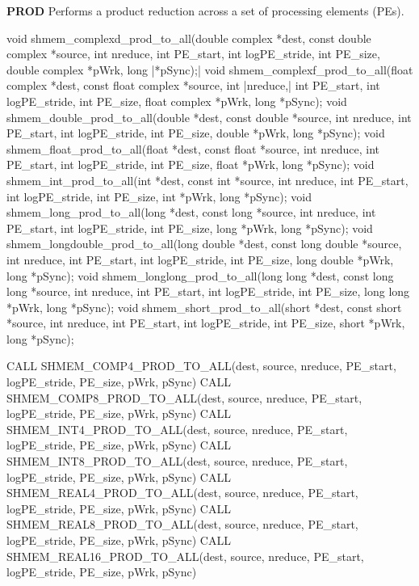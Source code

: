 \begin{apidefinition}
\bigskip
\textbf{PROD} \newline
Performs a product reduction across a set of processing elements (\ac{PE}s).\newline
\begin{Csynopsis}
void shmem_complexd_prod_to_all(double complex *dest, const double complex *source, int nreduce, int PE_start, int logPE_stride, int PE_size, double complex *pWrk, long |\mbox{*pSync);}|
void shmem_complexf_prod_to_all(float complex *dest, const float complex *source, int |\mbox{nreduce,}| int PE_start, int logPE_stride, int PE_size, float complex *pWrk, long *pSync);
void shmem_double_prod_to_all(double *dest, const double *source, int nreduce, int PE_start, int logPE_stride, int PE_size, double *pWrk, long *pSync);
void shmem_float_prod_to_all(float *dest, const float *source, int nreduce, int PE_start, int logPE_stride, int PE_size, float *pWrk, long *pSync);
void shmem_int_prod_to_all(int *dest, const int *source, int nreduce, int PE_start, int logPE_stride, int PE_size, int *pWrk, long *pSync);
void shmem_long_prod_to_all(long *dest, const long *source, int nreduce, int PE_start, int logPE_stride, int PE_size, long *pWrk, long *pSync);
void shmem_longdouble_prod_to_all(long double *dest, const long double *source, int nreduce, int PE_start, int logPE_stride, int PE_size, long double *pWrk, long *pSync);
void shmem_longlong_prod_to_all(long long *dest, const long long *source, int nreduce, int PE_start, int logPE_stride, int PE_size, long long *pWrk, long *pSync);
void shmem_short_prod_to_all(short *dest, const short *source, int nreduce, int PE_start, int logPE_stride, int PE_size, short *pWrk, long *pSync);
\end{Csynopsis}

\begin{Fsynopsis}
CALL SHMEM_COMP4_PROD_TO_ALL(dest, source, nreduce, PE_start, logPE_stride, PE_size, pWrk, pSync)
CALL SHMEM_COMP8_PROD_TO_ALL(dest, source, nreduce, PE_start, logPE_stride, PE_size, pWrk, pSync)
CALL SHMEM_INT4_PROD_TO_ALL(dest, source, nreduce, PE_start, logPE_stride, PE_size, pWrk, pSync)
CALL SHMEM_INT8_PROD_TO_ALL(dest, source, nreduce, PE_start, logPE_stride, PE_size, pWrk, pSync)
CALL SHMEM_REAL4_PROD_TO_ALL(dest, source, nreduce, PE_start, logPE_stride, PE_size, pWrk, pSync)
CALL SHMEM_REAL8_PROD_TO_ALL(dest, source, nreduce, PE_start, logPE_stride, PE_size, pWrk, pSync)
CALL SHMEM_REAL16_PROD_TO_ALL(dest, source, nreduce, PE_start, logPE_stride, PE_size, pWrk, pSync)
\end{Fsynopsis}


\end{apidefinition}
